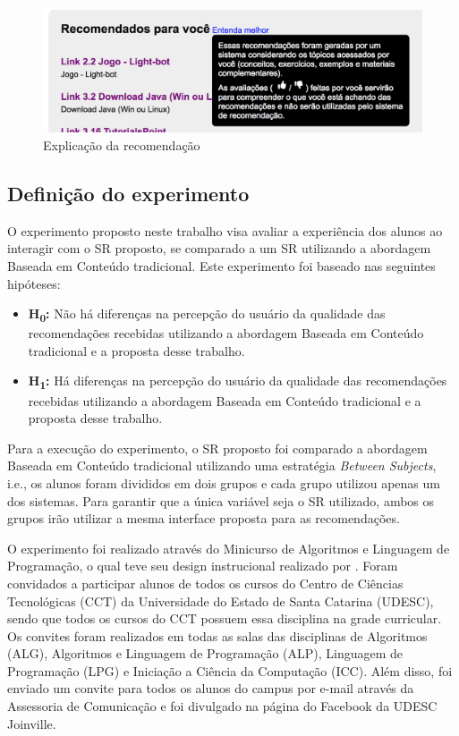 \begin{figure}[htb]
  \caption{\label{fig:adaptweb-proposta-explicacao}Explicação da recomendação}
  \begin{center}
      \includegraphics[scale=0.6]{./Figuras/explicacao-das-recomendacoes.png}
  \end{center}
\end{figure}

\subsection{Definição do experimento}\label{subsection:definicao-experimento}

O experimento proposto neste trabalho visa avaliar a experiência dos alunos ao interagir com o SR proposto, se comparado a um SR
utilizando a abordagem Baseada em Conteúdo tradicional. Este experimento foi
baseado nas seguintes hipóteses:

\begin{itemize}
\item \textbf{H\textsubscript{0}:} Não há diferenças na percepção do usuário da qualidade das recomendações recebidas utilizando a abordagem
Baseada em Conteúdo tradicional e a proposta desse trabalho.
\item \textbf{H\textsubscript{1}:} Há diferenças na percepção do usuário da qualidade das recomendações recebidas utilizando a abordagem
Baseada em Conteúdo tradicional e a proposta desse trabalho.
\end{itemize}

Para a execução do experimento, o SR proposto foi comparado a abordagem Baseada em Conteúdo tradicional utilizando uma
estratégia \textit{Between Subjects}, i.e., os alunos foram divididos em dois grupos e cada grupo utilizou apenas
um dos sistemas. Para garantir que a única variável seja o SR utilizado, ambos os grupos irão utilizar a mesma
interface proposta para as recomendações.

O experimento foi realizado através do Minicurso de Algoritmos e Linguagem de Programação, o qual teve seu design instrucional realizado por .
Foram convidados a participar alunos de todos os cursos do Centro de Ciências Tecnológicas (CCT) da Universidade do
Estado de Santa Catarina (UDESC), sendo que todos os cursos do CCT possuem essa disciplina na grade curricular. Os convites
foram realizados em todas as salas das disciplinas de Algoritmos (ALG), Algoritmos e Linguagem de Programação (ALP), Linguagem
de Programação (LPG) e Iniciação a Ciência da Computação (ICC). Além disso, foi enviado um convite para todos os alunos do
campus por e-mail através da Assessoria de Comunicação e foi divulgado na página do Facebook da UDESC Joinville.

